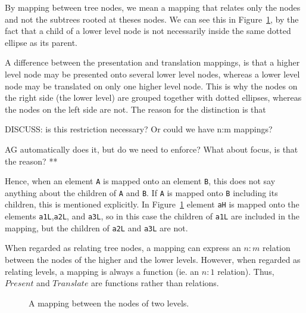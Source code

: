 By mapping between tree nodes, we mean a mapping that relates only the nodes and not the subtrees rooted at theses nodes. We can see this in Figure~\ref{nodeMapping}, by the fact that a child of a lower level node is not necessarily inside the same dotted ellipse as its parent.


A difference between the presentation and translation mappings, is that a higher level node may be presented onto several lower level nodes, whereas a lower level node may be translated on only one higher level node. This is why the nodes on the right side (the lower level) are grouped together with dotted ellipses, whereas the nodes on the left side are not. The reason for the distinction is that 
\toHere     %

DISCUSS: is this restriction necessary? Or could we have n:m mappings?

AG automatically does it, but do we need to enforce? What about focus, is that the reason?
**
\fromHere  %


\bc
Hence, when an element \verb|A| is mapped onto an element \verb|B|, this does not say anything about the children of \verb|A| and \verb|B|. If \verb|A| is mapped onto \verb|B| including its children, this is mentioned explicitly. In Figure~\ref{nodeMapping} element \verb|aH| is mapped onto the elements \verb|a1L|,\verb|a2L|, and \verb|a3L|, so in this case the children of \verb|a1L| are included in the mapping, but the children of \verb|a2L| and \verb|a3L| are not. 
\ec

\bc
When regarded as relating tree nodes, a mapping can express an $n:m$ relation between the nodes of the higher and the lower levels. However, when regarded as relating levels, a mapping is always a function (ie. an $n:1$ relation). Thus, $Present$ and $Translate$ are functions rather than relations.
\ec

\begin{figure}
\begin{center}
\begin{center}
\end{center}
\caption{A mapping between the nodes of two levels.}\label{nodeMapping} 
\end{center}
\end{figure}

